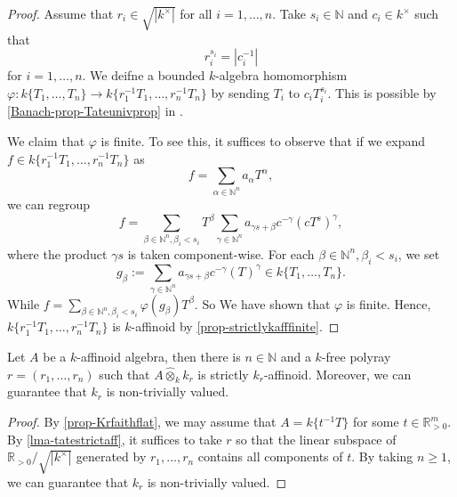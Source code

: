 \begin{proof}
    Assume that $r_i\in \sqrt{|k^{\times}|}$ for all $i=1,\ldots,n$. Take $s_i\in \mathbb{N}$ and $c_i\in k^{\times}$ such that 
    \[
        r_i^{s_i}=|c_i^{-1}|  
    \]
    for $i=1,\ldots,n$. We deifne a bounded $k$-algebra homomorphism $\varphi:k\{T_1,\ldots,T_n\}\rightarrow k\{r_1^{-1}T_1,\ldots,r_n^{-1}T_n\}$ by sending $T_i$ to $c_iT_i^{s_i}$. This is possible by \cref{Banach-prop-Tateunivprop} in .

    We claim that $\varphi$ is finite. To see this, it suffices to observe that if we expand $f\in k\{r_1^{-1}T_1,\ldots,r_n^{-1}T_n\}$ as
    \[
        f=\sum_{\alpha \in \mathbb{N}^n} a_{\alpha}T^{\alpha},  
    \]
    we can regroup
    \[
        f=\sum_{\beta \in \mathbb{N}^n, \beta_i<s_i} T^{\beta}\sum_{\gamma\in \mathbb{N}^n} a_{\gamma s+\beta}c^{-\gamma} (cT^s)^{\gamma},
    \]
    where the product $\gamma s$ is taken component-wise. For each $\beta \in \mathbb{N}^n, \beta_i<s_i$, we set
    \[
        g_{\beta}:=\sum_{\gamma\in \mathbb{N}^n} a_{\gamma s+\beta}c^{-\gamma} (T)^{\gamma}\in k\{T_1,\ldots,T_n\}.
    \]  
    While $f=\sum_{\beta \in \mathbb{N}^n, \beta_i<s_i} \varphi(g_{\beta})T^{\beta}$. So We have shown that $\varphi$ is finite. Hence, $k\{r_1^{-1}T_1,\ldots,r_n^{-1}T_n\}$ is $k$-affinoid by \cref{prop-strictlykafffinite}.
\end{proof}


\begin{proposition}\label{prop-redtostrictlykaff}
    Let $A$ be a $k$-affinoid algebra, then there is $n\in \mathbb{N}$ and a $k$-free polyray $r=(r_1,\ldots,r_n)$ such that $A\hat{\otimes}_k k_r$ is strictly $k_r$-affinoid. Moreover, we can guarantee that $k_r$ is non-trivially valued.
\end{proposition} 
\begin{proof}
    By \cref{prop-Krfaithflat}, we may assume that $A=k\{t^{-1}T\}$ for some $t\in \mathbb{R}^m_{>0}$. By \cref{lma-tatestrictaff}, it suffices to take $r$ so that the linear subspace of $\mathbb{R}_{>0}/\sqrt{|k^{\times}|}$ generated by $r_1,\ldots,r_n$ contains all components of $t$. By taking $n\geq 1$, we can guarantee that $k_r$ is non-trivially valued.
\end{proof}


